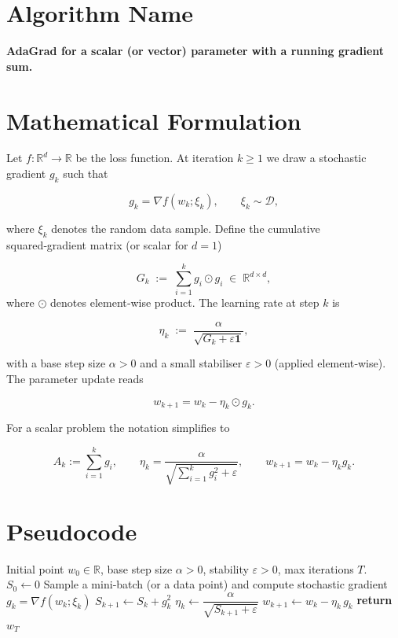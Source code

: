 \documentclass{article}
\begin{document}
\section*{Algorithm Name}
\textbf{AdaGrad for a scalar (or vector) parameter with a running gradient sum.}

\section*{Mathematical Formulation}
Let $f:\mathbb{R}^{d}\to\mathbb{R}$ be the loss function.  
At iteration $k\ge 1$ we draw a stochastic gradient $g_k$ such that  

\[
g_k = \nabla f(w_k; \xi_k),\qquad \xi_k\sim\mathcal{D},
\]

where $\xi_k$ denotes the random data sample.  
Define the cumulative squared‑gradient matrix (or scalar for $d=1$)

\[
G_k \;:=\; \sum_{i=1}^{k} g_i\odot g_i \;\in\;\mathbb{R}^{d\times d},
\]
where $\odot$ denotes element‑wise product.  
The learning rate at step $k$ is

\[
\eta_k \;:=\; \frac{\alpha}{\sqrt{G_k+\varepsilon\mathbf 1}},
\tag{1}
\]

with a base step size $\alpha>0$ and a small stabiliser $\varepsilon>0$ (applied element‑wise).  
The parameter update reads

\[
w_{k+1}= w_k - \eta_k\odot g_k .
\tag{2}
\]

For a scalar problem the notation simplifies to  

\[
A_k:=\sum_{i=1}^{k} g_i ,\qquad 
\eta_k = \frac{\alpha}{\sqrt{\sum_{i=1}^{k} g_i^{2}+\varepsilon}},\qquad 
w_{k+1}= w_k- \eta_k g_k .
\tag{3}
\]

\section*{Pseudocode}
\begin{algorithm}[H]
\caption{AdaGrad (scalar version)}
\begin{algorithmic}[1]
\Require Initial point $w_0\in\mathbb{R}$, base step size $\alpha>0$, stability $\varepsilon>0$, max iterations $T$.
\State $S_0 \gets 0$ 
    \State Sample a mini‑batch (or a data point) and compute stochastic gradient $g_k = \nabla f(w_k;\xi_k)$
    \State $S_{k+1} \gets S_k + g_k^{2}$ 
    \State $\eta_k \gets \dfrac{\alpha}{\sqrt{S_{k+1}+\varepsilon}}$
    \State $w_{k+1} \gets w_k - \eta_k\, g_k$
\EndFor
\State \textbf{return} $w_T$
\end{algorithmic}
\end{algorithm}
\end{document}
